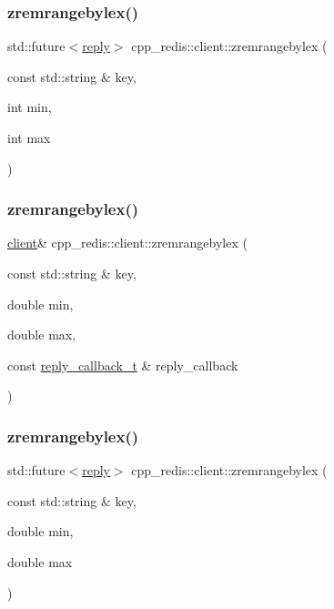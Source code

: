 \subsubsection{\texorpdfstring{zremrangebylex()}{zremrangebylex()}\hspace{0.1cm}{\footnotesize\ttfamily [2/6]}}
{\footnotesize\ttfamily std\+::future$<$\hyperlink{classcpp__redis_1_1reply}{reply}$>$ cpp\+\_\+redis\+::client\+::zremrangebylex (\begin{DoxyParamCaption}\item[{const std\+::string \&}]{key,  }\item[{int}]{min,  }\item[{int}]{max }\end{DoxyParamCaption})}

\mbox{\label{classcpp__redis_1_1client_ae03899c0520352eb6a800b9d6c12f2ae}} 
\subsubsection{\texorpdfstring{zremrangebylex()}{zremrangebylex()}\hspace{0.1cm}{\footnotesize\ttfamily [3/6]}}
{\footnotesize\ttfamily \hyperlink{classcpp__redis_1_1client}{client}\& cpp\+\_\+redis\+::client\+::zremrangebylex (\begin{DoxyParamCaption}\item[{const std\+::string \&}]{key,  }\item[{double}]{min,  }\item[{double}]{max,  }\item[{const \hyperlink{classcpp__redis_1_1client_a061a1140d36d2eaeda82b09a0bb3f9f2}{reply\+\_\+callback\+\_\+t} \&}]{reply\+\_\+callback }\end{DoxyParamCaption})}

\mbox{\label{classcpp__redis_1_1client_a6ed8333a10d5c4390f3e52f91c436264}} 
\subsubsection{\texorpdfstring{zremrangebylex()}{zremrangebylex()}\hspace{0.1cm}{\footnotesize\ttfamily [4/6]}}
{\footnotesize\ttfamily std\+::future$<$\hyperlink{classcpp__redis_1_1reply}{reply}$>$ cpp\+\_\+redis\+::client\+::zremrangebylex (\begin{DoxyParamCaption}\item[{const std\+::string \&}]{key,  }\item[{double}]{min,  }\item[{double}]{max }\end{DoxyParamCaption})}

